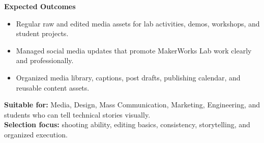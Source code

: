 \documentclass[10pt,a4paper]{article}
\newcommand{\RoleSection}[1]{\vspace{5pt}\par\noindent\textbf{#1}\par\vspace{2pt}}
\begin{document}
{\RoleSection{Expected Outcomes}
\begin{itemize}
  \item Regular raw and edited media assets for lab activities, demos, workshops, and student projects.
  \item Managed social media updates that promote MakerWorks Lab work clearly and professionally.
  \item Organized media library, captions, post drafts, publishing calendar, and reusable content assets.
\end{itemize}

\textbf{Suitable for:} Media, Design, Mass Communication, Marketing, Engineering, and students who can tell technical stories visually.\\
\textbf{Selection focus:} shooting ability, editing basics, consistency, storytelling, and organized execution.
}
\end{document}

